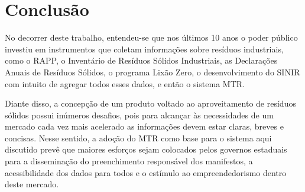 \chapter{Conclusão}

No decorrer deste trabalho, entendeu-se que nos últimos 10 anos o poder público investiu em instrumentos que coletam informações sobre resíduos industriais, como o \gls{RAPP}, o Inventário de Resíduos Sólidos Industriais, as Declarações Anuais de Resíduos Sólidos, o programa Lixão Zero, o desenvolvimento do \gls{SINIR} com intuito de agregar todos esses dados, e então o sistema \gls{MTR}. 

Diante disso, a concepção de um produto voltado ao aproveitamento de resíduos sólidos possui inúmeros desafios, pois para alcançar às necessidades de um mercado cada vez mais acelerado as informações devem estar claras, breves e concisas. Nesse sentido, a adoção do \gls{MTR} como base para o sistema aqui discutido prevê que maiores esforços sejam colocados pelos governos estaduais para a disseminação do preenchimento responsável dos manifestos, a acessibilidade dos dados para todos e o estímulo ao empreendedorismo dentro deste mercado.

